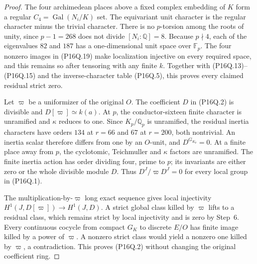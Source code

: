 \begin{proof}
The four archimedean places above a fixed complex embedding of
$K$ form a regular $C_4=\operatorname{Gal}(N_i/K)$ set.
The equivariant unit character is the regular character minus
the trivial character.  There is no $p$-torsion among the roots
of unity, since $p-1=268$ does not divide $[N_i:\mathbb Q]=8$.
Because $p\nmid4$, each of the eigenvalues $82$ and $187$ has
a one-dimensional unit space over $\mathbb F_p$.
The four nonzero images in (P16Q.19) make localization injective
on every required space, and this remains so after tensoring
with any finite $k$.
Together with (P16Q.13)--(P16Q.15) and the inverse-character
table (P16Q.5), this proves every claimed residual strict zero.

Let $\varpi$ be a uniformizer of the original $O$.
The coefficient $D$ in (P16Q.2) is divisible and
$D[\varpi]\simeq k(a)$.
At $p$, the conductor-sixteen finite character is unramified
and $\kappa$ reduces to one.  Since $K_p/\mathbb Q_p$ is
unramified, the residual inertia characters have orders
$134$ at $r=66$ and $67$ at $r=200$, both nontrivial.
An inertia scalar therefore differs from one by an $O$-unit,
and $D^{G_{K_p}}=0$.
At a finite place away from $p$, the cyclotomic, Teichmuller
and $\kappa$ factors are unramified.
The finite inertia action has order dividing four, prime to $p$;
its invariants are either zero or the whole divisible module $D$.
Thus $D^J/\varpi D^J=0$ for every local group in (P16Q.1).

The multiplication-by-$\varpi$ long exact sequence gives
local injectivity $H^1(J,D[\varpi])\to H^1(J,D)$.
A strict global class killed by $\varpi$ lifts to a residual
class, which remains strict by local injectivity and is zero
by Step~6.
Every continuous cocycle from compact $G_K$ to discrete $E/O$
has finite image killed by a power of $\varpi$.
A nonzero strict class would yield a nonzero one killed by
$\varpi$, a contradiction.  This proves (P16Q.2) without
changing the original coefficient ring.
\end{proof}

